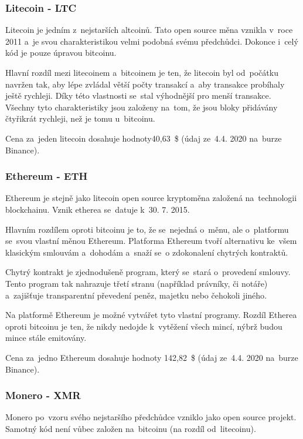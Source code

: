 \documentclass[thesis=B,czech]{FITthesis}[2019/03/21]
\begin{document}
\subsubsection{Litecoin - LTC}
Litecoin je jedním z~nejstarších altcoinů. Tato open source měna vznikla v~roce 2011 a~je svou charakteristikou velmi podobná svému předchůdci. \cite{litecoin} Dokonce i~celý kód je pouze úpravou bitcoinu. \cite{alza_monero}

Hlavní rozdíl mezi litecoinem a~bitcoinem je ten, že litecoin byl od~počátku navržen tak, aby lépe zvládal větší počty transakcí a~aby transakce probíhaly ještě rychleji. Díky této vlastnosti se~stal výhodnější pro menší transakce. Všechny tyto charakteristiky jsou založeny na~tom, že jsou bloky přidávány čtyřikrát rychleji, než je tomu u~bitcoinu. \cite{litecoin}

Cena za~jeden litecoin dosahuje hodnoty40,63~\$ (údaj ze~4.4. 2020 na~burze Binance). \cite{binance_markets}

\subsubsection{Ethereum - ETH}
Ethereum je stejně jako litecoin open source kryptoměna založená na~technologii blockchainu. Vznik etherea se~datuje k~30. 7. 2015. 

Hlavním rozdílem oproti bitcoinu je to, že se~nejedná o~měnu, ale o~platformu se~svou vlastní měnou Ethereum. Platforma Ethereum tvoří alternativu ke~všem klasickým smlouvám a~dohodám a~snaží se~o zdokonalení chytrých kontraktů. \cite{btc_vs_eth}

Chytrý kontrakt je zjednodušeně program, který se~stará o~provedení smlouvy. Tento program tak nahrazuje třetí stranu (například právníky, či notáře) a~zajišťuje transparentní převedení peněz, majetku nebo čehokoli \linebreak jiného. \cite{ethereum}

Na platformě Ethereum je možné vytvářet tyto vlastní programy. \cite{ethereum} Rozdíl Etherea oproti bitcoinu je ten, že nikdy nedojde k~vytěžení všech mincí, nýbrž budou mince stále emitovány. \cite{alza_monero}

Cena za~jedno Ethereum dosahuje hodnoty 142,82~\$ (údaj ze~4.4. 2020 na~burze Binance). \cite{binance_markets}

\subsubsection{Monero - XMR}
Monero po~vzoru svého nejstaršího předchůdce vzniklo jako open source projekt. Samotný kód není vůbec založen na~bitcoinu (na rozdíl od~litecoinu). 
\end{document}
